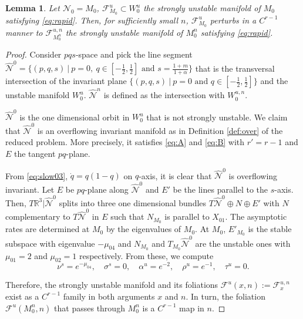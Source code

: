 \documentclass[usletter,11pt]{article}
\def\red{\color{red}}
\newtheorem{lemma}{Lemma}[section]
\theoremstyle{remark}
\begin{document}
\begin{lemma} \label{lem:rapid}
 Let $\mathcal{N}_0=M_0$, $\mathcal{F}^u_{M_0}\subset W_0^u$  the strongly unstable manifold of $M_0$ satisfying \eqref{eq:rapid}. Then, for sufficiently small $n$, $\mathcal{F}^u_{M_0}$ perturbs in a $C^{r-1}$ manner to $\mathcal{F}^{u,n}_{M_0^n}$ the strongly unstable manifold of $M_0^n$ satisfying \eqref{eq:rapid}. 
\end{lemma}
\begin{proof}
 {\red
Consider $pqs$-space and pick the line segment $\hat{\mathcal{N}}^{0}=\Big\{(p,q,s)~|~ p=0, ~ q\in [- \frac{1}{2}, \frac{1}{2}] \text{ and } s= \frac{1+m}{1+\alpha}\Big\}$ that is the transversal intersection of the invariant plane $\Big\{(p,q,s)~|~ p=0 \text{ and }q\in [- \frac{1}{2}, \frac{1}{2}] \Big\}$ and the unstable manifold $W_0^u$. $\hat{\mathcal{N}}^{n}$ is defined as the intersection with $W_0^{u,n}$.

 }

  $\hat{\mathcal{N}}^{0}$ is the one dimensional orbit in $W_0^u$ that is not strongly unstable. We claim that $\hat{\mathcal{N}}^{0}$ is an overflowing invariant manifold as in Definition \ref{def:over} of the reduced problem. More precisely, it satisfies \eqref{eq:A} and \eqref{eq:B} with $r'=r-1$ and $E$ the tangent $pq$-plane. 

 From \eqref{eq:slow03}, $\dot{q}=q(1-q)$ on $q$-axis, it is clear that $\hat{\mathcal{N}}^{0}$ is overflowing invariant. Let $E$ be $pq$-plane along $\hat{\mathcal{N}}^{0}$ and $E'$ be the lines parallel to the $s$-axis. Then, $T \mathbb{R}^3|\hat{\mathcal{N}}^{0}$ splits into three one dimensional bundles $T\hat{\mathcal{N}}^{0}\oplus N \oplus E'$ with $N$ complementary to $T\hat{\mathcal{N}}^{0}$ in $E$ such that $N_{M_0}$ is parallel to $X_{01}$.  %
 The asymptotic rates are determined at $M_0$ by the eigenvalues of $M_0$. At $M_0$, $E'_{M_0}$ is the stable subspace with eigenvalue $-\mu_{04}$ and $N_{M_0}$ and $T_{M_0}\hat{\mathcal{N}}^{0}$ are the unstable ones with $\mu_{01}=2$ and $\mu_{02}=1$ respectively. From these, we compute 
 $$ \nu^s = e^{-\mu_{04}}, \quad\sigma^s = 0, \quad\alpha^u = e^{-2}, \quad\rho^u=e^{-1}, \quad\tau^u=0.$$

 Therefore, the strongly unstable manifold and its foliations $\mathcal{F}^{u}(x,n):=\mathcal{F}^{u,n}_x$ exist as a $C^{r-1}$ family in both arguments $x$ and $n$. In turn, the foliation 
 $\mathcal{F}^u(M_0^n,n)$ that passes through $M_0^n$ is a $C^{r-1}$ map in $n$. 
\end{proof}
\end{document}
